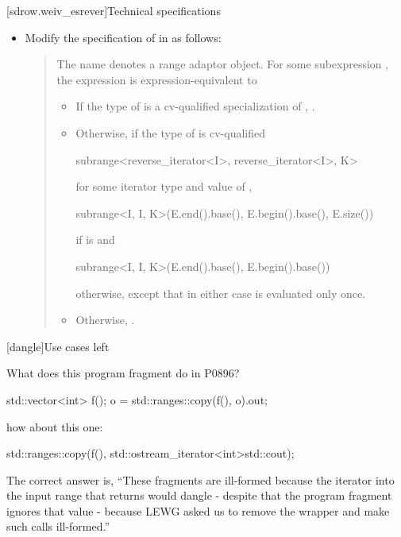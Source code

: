 [sdrow.weiv_esrever]{Technical specifications}

\begin{itemize}
\item Modify the specification of  in
   as follows:
  \begin{quote}
\pnum
The name  denotes a
range adaptor object.
For some subexpression , the expression
 is expression-equivalent to\added{:}
\begin{addedblock}
\begin{itemize}
\item If the type of  is a cv-qualified specialization of
  , .
\item Otherwise, if the type of  is cv-qualified
  \begin{codeblock}
  subrange<reverse_iterator<I>, reverse_iterator<I>, K>
  \end{codeblock}
  for some iterator type  and
  value  of ,
  \begin{codeblock}
  subrange<I, I, K>(E.end().base(), E.begin().base(), E.size())
  \end{codeblock}
  if  is  and
  \begin{codeblock}
  subrange<I, I, K>(E.end().base(), E.begin().base())
  \end{codeblock}
  otherwise, except that in either case  is evaluated only once.
\item Otherwise, .
\end{itemize}
\end{addedblock}
  \end{quote}
\end{itemize}


[dangle]{Use cases left }

What does this program fragment do in P0896?
\begin{codeblock}
std::vector<int> f();
o = std::ranges::copy(f(), o).out;
\end{codeblock}
how about this one:
\begin{codeblock}
std::ranges::copy(f(), std::ostream_iterator<int>{std::cout});
\end{codeblock}
The correct answer is, ``These fragments are ill-formed because the iterator into
the input range that  returns would dangle - despite that
the program fragment ignores that value - because LEWG asked us to remove the
 wrapper and make such calls ill-formed.''


